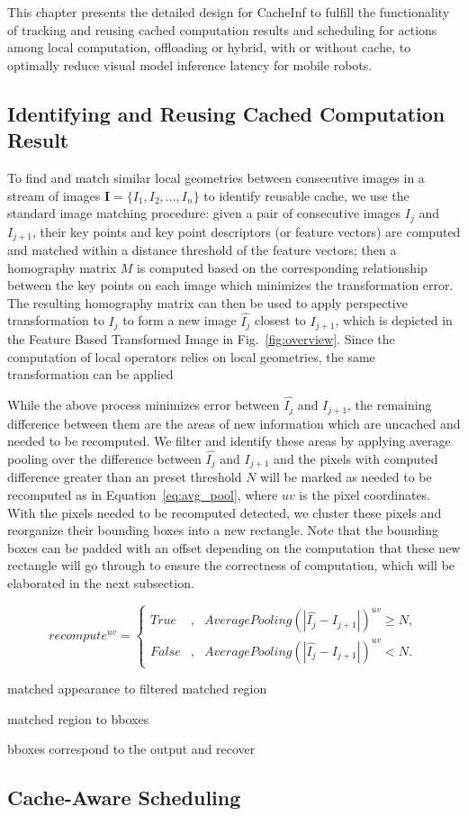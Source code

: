 This chapter presents the detailed design for CacheInf to fulfill the functionality of tracking and reusing cached computation results and scheduling for actions among local computation, offloading or hybrid, with or without cache, to optimally reduce visual model inference latency for mobile robots.

\subsection{Identifying and Reusing Cached Computation Result}
To find and match similar local geometries between consecutive images in a stream of images $\textbf{I}=\{I_1, I_2, ..., I_n\}$ to identify reusable cache, we use the standard image matching procedure: given a pair of consecutive images $I_j$ and $I_{j+1}$, their key points and key point descriptors (or feature vectors) are computed and matched within a distance threshold of the feature vectors; then a homography matrix $M$ is computed based on the corresponding relationship between the key points on each image which minimizes the transformation error.
The resulting homography matrix can then be used to apply perspective transformation to $I_j$ to form a new image $\hat{I_j}$ closest to $I_{j+1}$, which is depicted in the Feature Based Transformed Image in Fig.~\ref{fig:overview}.
Since the computation of local operators relies on local geometries, the same transformation can be applied 

While the above process minimizes error between $\hat{I_j}$ and $I_{j+1}$, the remaining difference between them are the areas of new information which are uncached and needed to be recomputed.
We filter and identify these areas by applying average pooling over the difference between $\hat{I_j}$ and $I_{j+1}$ and the pixels with computed difference greater than an preset threshold $N$ will be marked as needed to be recomputed as in Equation~\ref{eq:avg_pool}, where $uv$ is the pixel coordinates.
With the pixels needed to be recomputed detected, we cluster these pixels and reorganize their bounding boxes into a new rectangle. 
Note that the bounding boxes can be padded with an offset depending on the computation that these new rectangle will go through to ensure the correctness of computation, which will be elaborated in the next subsection.

\begin{equation}
    recompute^{uv}=\left\{
        \begin{aligned}
        True & , & AveragePooling(|\hat{I_j} - I_{j+1}|)^{uv} \geq N, \\
        False & , & AveragePooling(|\hat{I_j} - I_{j+1}|)^{uv} < N.
        \end{aligned}
    \right. 
    \label{eq:avg_pool}
\end{equation}




matched appearance to filtered matched region 

matched region to bboxes 

bboxes correspond to the output and recover


\subsection{Cache-Aware Scheduling}